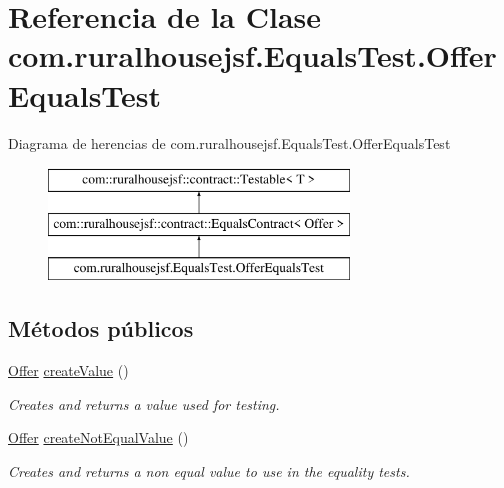 \hypertarget{classcom_1_1ruralhousejsf_1_1_equals_test_1_1_offer_equals_test}{}\section{Referencia de la Clase com.\+ruralhousejsf.\+Equals\+Test.\+Offer\+Equals\+Test}
\label{classcom_1_1ruralhousejsf_1_1_equals_test_1_1_offer_equals_test}
Diagrama de herencias de com.\+ruralhousejsf.\+Equals\+Test.\+Offer\+Equals\+Test\begin{figure}[H]
\begin{center}
\leavevmode
\includegraphics[height=3.000000cm]{d5/d5b/classcom_1_1ruralhousejsf_1_1_equals_test_1_1_offer_equals_test}
\end{center}
\end{figure}
\subsection*{Métodos públicos}
\begin{DoxyCompactItemize}
\item 
\mbox{\hyperlink{classcom_1_1ruralhousejsf_1_1domain_1_1_offer}{Offer}} \mbox{\hyperlink{classcom_1_1ruralhousejsf_1_1_equals_test_1_1_offer_equals_test_a25524d0ab8278899774751c0f7630e8d}{create\+Value}} ()
\begin{DoxyCompactList}\small\item\em Creates and returns a value used for testing. \end{DoxyCompactList}\item 
\mbox{\hyperlink{classcom_1_1ruralhousejsf_1_1domain_1_1_offer}{Offer}} \mbox{\hyperlink{classcom_1_1ruralhousejsf_1_1_equals_test_1_1_offer_equals_test_a459de0dbb86bdaa6f54b99eb887a2eab}{create\+Not\+Equal\+Value}} ()
\begin{DoxyCompactList}\small\item\em Creates and returns a non equal value to use in the equality tests. \end{DoxyCompactList}\end{DoxyCompactItemize}


